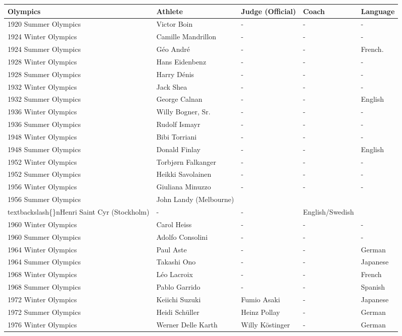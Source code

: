 \documentclass{article}
\begin{document}
\begin{tabular}{lllll}
\toprule
Olympics & Athlete & Judge (Official) & Coach & Language \\
\midrule
1920 Summer Olympics & Victor Boin & - & - & - \\
1924 Winter Olympics & Camille Mandrillon & - & - & - \\
1924 Summer Olympics & Géo André & - & - & French. \\
1928 Winter Olympics & Hans Eidenbenz & - & - & - \\
1928 Summer Olympics & Harry Dénis & - & - & - \\
1932 Winter Olympics & Jack Shea & - & - & - \\
1932 Summer Olympics & George Calnan & - & - & English \\
1936 Winter Olympics & Willy Bogner, Sr. & - & - & - \\
1936 Summer Olympics & Rudolf Ismayr & - & - & - \\
1948 Winter Olympics & Bibi Torriani & - & - & - \\
1948 Summer Olympics & Donald Finlay & - & - & English \\
1952 Winter Olympics & Torbjørn Falkanger & - & - & - \\
1952 Summer Olympics & Heikki Savolainen & - & - & - \\
1956 Winter Olympics & Giuliana Minuzzo & - & - & - \\
1956 Summer Olympics & John Landy (Melbourne)\\textbackslash\{\}nHenri Saint Cyr (Stockholm) & - & - & English/Swedish \\
1960 Winter Olympics & Carol Heiss & - & - & - \\
1960 Summer Olympics & Adolfo Consolini & - & - & - \\
1964 Winter Olympics & Paul Aste & - & - & German \\
1964 Summer Olympics & Takashi Ono & - & - & Japanese \\
1968 Winter Olympics & Léo Lacroix & - & - & French \\
1968 Summer Olympics & Pablo Garrido & - & - & Spanish \\
1972 Winter Olympics & Keiichi Suzuki & Fumio Asaki & - & Japanese \\
1972 Summer Olympics & Heidi Schüller & Heinz Pollay & - & German \\
1976 Winter Olympics & Werner Delle Karth & Willy Köstinger & - & German \\

\end{tabular}
\end{document}
